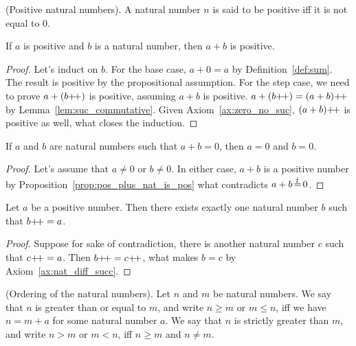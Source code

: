 \begin{definition}
    \textup{(Positive natural numbers)}. A natural number $n$ is said to be positive iff it is not equal to $0$.\label{def:pos_nat} 
\end{definition}
\begin{proposition}
     If $a$ is positive and $b$ is a natural number, then $a + b$ is positive.\label{prop:pos_plus_nat_is_pos}
\end{proposition}
\begin{proof}
    Let's induct on $b$. For the base case, $a+0=a$ by Definition~\ref{def:sum}. The result is positive by the propositional assumption. For the step case, we need to prove $a+(b\operatorname{\!+\!+})$ is positive, assuming $a+b$ is positive. $a+(b\operatorname{\!+\!+})=(a+b)\operatorname{\!+\!+}$ by Lemma~\ref{lem:suc_commutative}. Given Axiom~\ref{ax:zero_no_suc}, $(a+b)\operatorname{\!+\!+}$ is positive as well, what closes the induction.
\end{proof}
\begin{corollary}
    If $a$ and $b$ are natural numbers such that $a+b =0$, then $a = 0$ and $b = 0$.\label{cor:a+b=0}
\end{corollary}
\begin{proof}
    Let's assume that $a\neq0$ or $b\neq 0$. In either case, $a+b$ is a positive number by Proposition~\ref{prop:pos_plus_nat_is_pos} what contradicts $a+b\operatorname{\stackrel{\lightning}{=}}0$. 
\end{proof}

\begin{lemma}
    Let $a$ be a positive number. Then there exists exactly one natural number $b$ such that $b\operatorname{\!+\!+} = a$.
\end{lemma}
\begin{proof}
    Suppose for sake of contradiction, there is another natural number $c$ such that $c\operatorname{\!+\!+}=a$. Then $b\operatorname{\!+\!+}=c\operatorname{\!+\!+}$, what makes $b=c$ by Axiom~\ref{ax:nat_diff_succ}.
\end{proof}

\begin{definition}
     \textup{(Ordering of the natural numbers)}. Let $n$ and $m$ be natural numbers. We say that $n$ is greater than or equal to $m$, and write $n \geq m$ or $m \leq n$, iff we have $n = m + a$ for some natural number $a$. We say that $n$ is strictly greater than $m$, and write $n > m$ or $m < n$, iff $n \geq m$ and $n \neq m$.\label{def:nat_order}
\end{definition}

